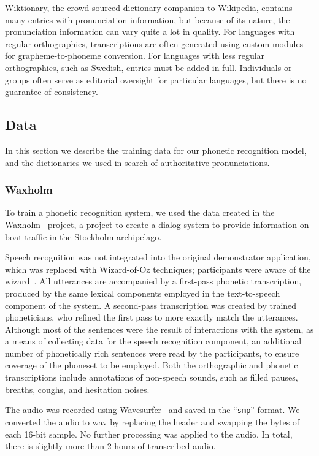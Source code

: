 \documentclass{Interspeech}
\begin{document}
Wiktionary, the crowd-sourced dictionary companion to Wikipedia, contains many entries with pronunciation information, but because of its nature, the pronunciation information can vary quite a lot in quality. For languages with regular orthographies, transcriptions are often generated using custom modules for grapheme-to-phoneme conversion. For languages with less regular orthographies, such as Swedish, entries must be added in full. Individuals or groups often serve as editorial oversight for particular languages, but there is no guarantee of consistency.

\subsection{Data}

In this section we describe the training data for our phonetic recognition model, and the dictionaries we used in search of authoritative pronunciations.

\subsubsection{Waxholm}
To train a phonetic recognition system, we used the data created in the Waxholm~\cite{bertenstam1995waxholm} project, a project to create a dialog system to provide information on boat traffic in the Stockholm archipelago.

Speech recognition was not integrated into the original demonstrator application, which was replaced with Wizard-of-Oz techniques; participants were aware of the wizard~\cite{blomberg1993waxholm}. All utterances are accompanied by a first-pass phonetic transcription, produced by the same lexical components employed in the text-to-speech component of the system. A second-pass transcription was created by trained phoneticians, who refined the first pass to more exactly match the utterances. Although most of the sentences were the result of interactions with the system, as a means of collecting data for the speech recognition component, an additional number of phonetically rich sentences were read by the participants, to ensure coverage of the phoneset to be employed. Both the orthographic and phonetic transcriptions include annotations of non-speech sounds, such as filled pauses, breaths, coughs, and hesitation noises.

The audio was recorded using Wavesurfer~\cite{sjolander2000wavesurfer} and saved in the ``\texttt{smp}'' format. We converted the audio to wav by replacing the header and swapping the bytes of each 16-bit sample. No further processing was applied to the audio. In total, there is slightly more than 2 hours of transcribed audio.
\end{document}
